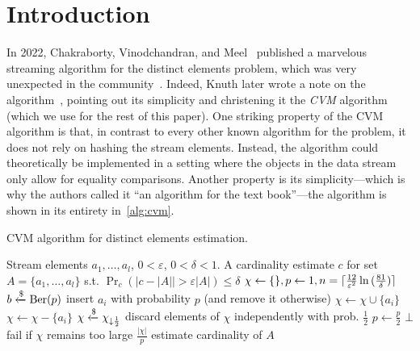 \section{Introduction}
\label{sec:intro}

In 2022, Chakraborty, Vinodchandran, and Meel~\cite{DBLP:conf/esa/0001VM22} published a marvelous streaming algorithm for the distinct elements problem, which was very unexpected in the community~\cite{quanta}.
Indeed, Knuth later wrote a note on the algorithm~\cite{knuthnote}, pointing out its simplicity and christening it the \emph{CVM} algorithm (which we use for the rest of this paper).
One striking property of the CVM algorithm is that, in contrast to every other known algorithm for the problem, it does not rely on hashing the stream elements.
Instead, the algorithm could theoretically be implemented in a setting where the objects in the data stream only allow for equality comparisons.
Another property is its simplicity---which is why the authors called it ``an algorithm for the text book''---the algorithm is shown in its entirety in~\cref{alg:cvm}.

\begin{algorithm}[h!]
	\caption{CVM algorithm for distinct elements estimation.}\label{alg:cvm}
	\begin{algorithmic}[1]
  \Require Stream elements $a_1,\dots,a_l$, $0 < \varepsilon$, $0 < \delta < 1$.
  \Ensure A cardinality estimate $c$ for set $A = \{ a_1,\dots,a_l \}$ s.t. $\Pr_c \left( | c - |A| | > \varepsilon |A| \right) \leq \delta$
  \State $\chi \gets \{\}, p \gets 1, n = \lceil\frac{12}{\varepsilon^2} \ln{(\frac{81}{\delta})} \rceil$
    \State $b \xleftarrow{\$} \operatorname{Ber}(p)$ \Comment insert $a_i$ with probability $p$ (and remove it otherwise)
      \State $\chi \gets \chi \cup \{a_i\}$
    \Else
      \State $\chi \gets \chi - \{a_i\}$
    \EndIf
      \State $\chi \xleftarrow{\$} \chi_{\downarrow \frac{1}{2}}$ \Comment discard elements of $\chi$ independently with prob. $\frac{1}{2}$
      \State $p \gets \frac{p}{2}$
    \EndIf
      \Return $\bot$ \Comment fail if $\chi$ remains too large
    \EndIf
  \EndFor
  \Return $\frac{|\chi|}{p}$ \Comment estimate cardinality of $A$
  \end{algorithmic}
\end{algorithm}

